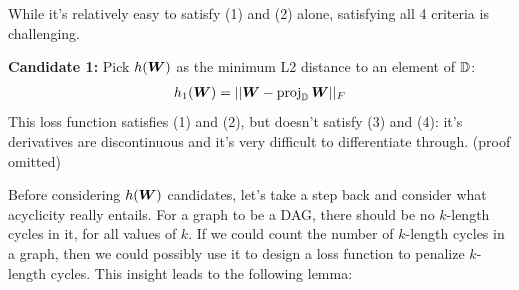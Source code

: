 \documentclass[11pt,a4paper]{article}
\begin{document}
While it's relatively easy to satisfy (1) and (2) alone, satisfying all 4 criteria is challenging. 

\textbf{Candidate 1:} Pick $h({\bm{W}})$ as the minimum L2 distance to an element of $\mathbb{D}$:
\begin{align}
    h_{1}({\bm{W}}) = ||{\bm{W}} - \operatorname{proj}_{\mathbb{D}} {\bm{W}}||_{F}
\end{align}
This loss function satisfies (1) and (2), but doesn't satisfy (3) and (4): it's derivatives are discontinuous and it's very difficult to differentiate through. (proof omitted)

Before considering $h({\bm{W}})$ candidates, let's take a step back and consider what acyclicity really entails. For a graph to be a DAG, there should be no $k$-length cycles in it, for all values of $k$. If we could count the number of $k$-length cycles in a graph, then we could possibly use it to design a loss function to penalize $k$-length cycles. This insight leads to the following lemma:
\end{document}
